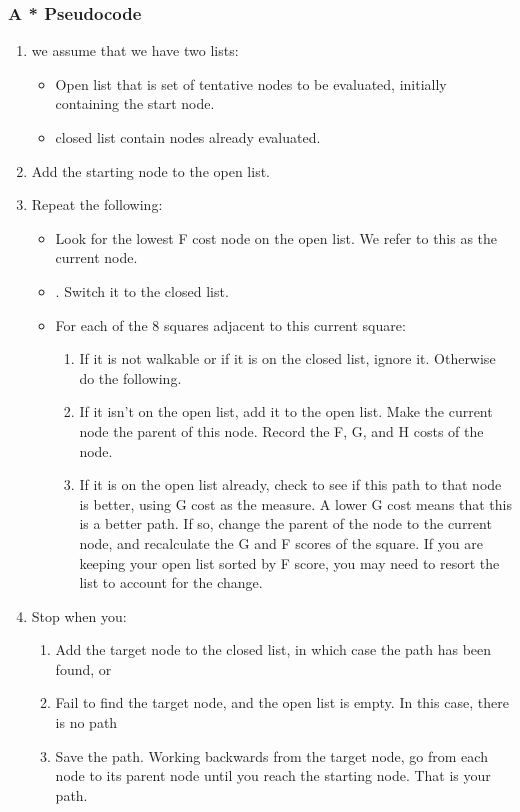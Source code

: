 \subsubsection{A * Pseudocode}
\begin{enumerate}
    \setcounter{enumi}{0}
        \item we assume that we have two lists: 
            \begin{itemize}
            \item Open list that is set of tentative nodes to be evaluated, initially containing the start node.
            \item closed list contain nodes already evaluated.
            \end{itemize}
    \item  Add the starting node to the open list.
    \item Repeat the following:
        \begin{itemize}
        \item Look for the lowest F cost node on the open list. We refer to this as the current node.
        \item . Switch it to the closed list.
        \item  For each of the 8 squares adjacent to this current square:
            \begin{enumerate}
            \item If it is not walkable or if it is on the closed list, ignore it. Otherwise do the following.
            \item If it isn’t on the open list, add it to the open list. Make the current node the parent of this node. Record the F, G, and H costs of the node.
            
           \item If it is on the open list already, check to see if this path to that node is better, using G cost as the measure. A lower G cost means that this is a better path. If so, change the parent of the node to the current node, and recalculate the G and F scores of the square. If you are keeping your open list sorted by F score, you may need to resort the list to account for the change.
            \end{enumerate}
        \end{itemize}   
        \item Stop when you:
            
         \begin{enumerate}
            \item Add the target node to the closed list, in which case the path has been found, or
            \item Fail to find the target node, and the open list is empty. In this case, there is no path
            
           \item Save the path. Working backwards from the target node, go from each node to its parent node until you reach the starting node. That is your path.\cite{A-Star} 
            \end{enumerate}
\end{enumerate}
